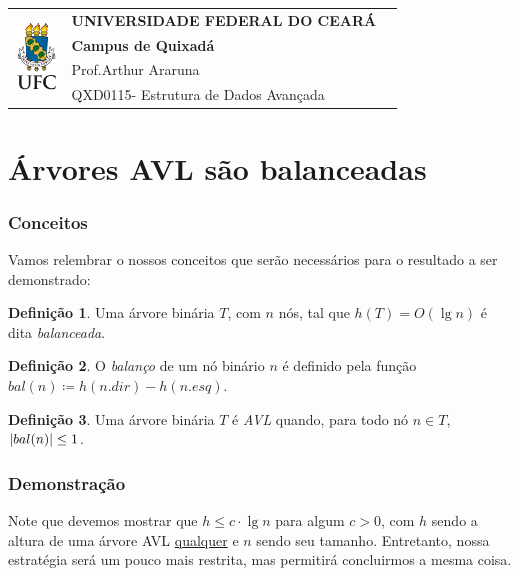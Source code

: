 \documentclass[10pt,a4paper,twoside]{article}
\DeclarePairedDelimiter{\abs}{\lvert}{\rvert}
\theoremstyle{definition}
\newtheorem{definition}{Definição}[section]
\def\disciplinacodigotext{QXD0115}
\def\disciplinanometext{Estrutura de Dados Avançada}
\def\provatitle{Árvores AVL são balanceadas}
\def\professorabbrv{Prof.}
\def\professornometext{Arthur Araruna}
\begin{document}
\noindent
\begin{minipage}{\textwidth}
	\begin{tabularx}{\textwidth}{cXc}
	\multirow{4}{*}{\includegraphics[height=1.8cm]{brasaoufc.pdf}} & {\bf UNIVERSIDADE FEDERAL DO CEARÁ} & \multirow{3}{*}{} \\
	& {\bf Campus de Quixadá} & \\
	& \professorabbrv\enspace\professornometext & \\
	& \disciplinacodigotext - \disciplinanometext & {} \\
	\end{tabularx}
\end{minipage}

\bigskip
\bigskip

\part*{\provatitle}
\section{Conceitos}

Vamos relembrar o nossos conceitos que serão necessários para o resultado a ser demonstrado:

\begin{definition}
	Uma árvore binária \( T \), com \( n \) nós, tal que \( h(T) = O(\lg n) \) é dita \emph{balanceada}.
\end{definition}

\begin{definition}
    O \emph{balanço} de um nó binário \( n \) é definido pela função \( bal(n) \coloneqq h(n.dir) - h(n.esq) \).
\end{definition}

\begin{definition}
    Uma árvore binária \( T \) é \emph{AVL} quando, para todo nó \( n \in T \), \( \abs{bal(n)} \leq 1 \).
\end{definition}

\section{Demonstração}

Note que devemos mostrar que \( h \leq c \cdot \lg n \) para algum \( c > 0 \), com \( h \) sendo a altura de uma árvore AVL \ul{qualquer} e \( n \) sendo seu tamanho. Entretanto, nossa estratégia será um pouco mais restrita, mas permitirá concluirmos a mesma coisa.
\end{document}
